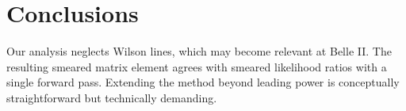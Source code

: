 \section{Conclusions}\label{sec:conclusions}

Our analysis neglects Wilson lines, which may become relevant at Belle
II. The resulting smeared matrix element agrees with smeared likelihood
ratios with a single forward pass. Extending the method beyond leading
power is conceptually straightforward but technically demanding.

